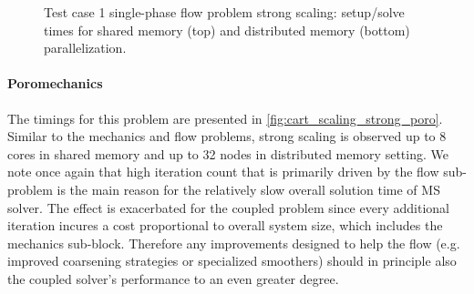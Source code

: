 \begin{figure} [htbp]
  \begin{subfigure}[t]{0.48\textwidth}
    \centering
    
  \end{subfigure}
  \hfill
  \begin{subfigure}[t]{0.48\textwidth}
    \centering
    
  \end{subfigure}
  \begin{subfigure}[t]{0.48\textwidth}
    \centering
    
  \end{subfigure}
  \hfill
  \begin{subfigure}[t]{0.48\textwidth}
    \centering
    
  \end{subfigure}
  \caption[Test case 1 single-phase flow problem strong scaling]{Test case 1 single-phase flow problem strong scaling: setup/solve times for shared memory (top) and distributed memory (bottom) parallelization.}
  \label{fig:cart_scaling_strong_flow}
\end{figure}

\paragraph{Poromechanics}
The timings for this problem are presented in \cref{fig:cart_scaling_strong_poro}.   Similar to the mechanics and flow problems, strong scaling is observed up to 8 cores in shared memory and up to 32 nodes in distributed memory setting.   We note once again that high iteration count that is primarily driven by the flow sub-problem is the main reason for the relatively slow overall solution time of MS solver.   The effect is exacerbated for the coupled problem since every additional iteration incures a cost proportional to overall system size, which includes the mechanics sub-block.   Therefore any improvements designed to help the flow (e.g. improved coarsening strategies or specialized smoothers) should in principle also the coupled solver's performance to an even greater degree.

